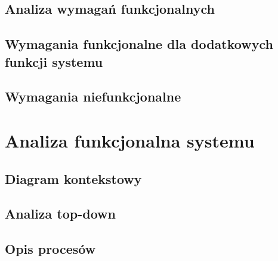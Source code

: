 \documentclass[paper=a4, fontsize=12pt]{scrartcl}
\numberwithin{equation}{section}		%
\numberwithin{figure}{section}			%
\numberwithin{table}{section}				%
\begin{document}
	\subsection{Analiza wymagań funkcjonalnych}
		

	\subsection{Wymagania funkcjonalne dla dodatkowych funkcji systemu}
		

	\subsection{Wymagania niefunkcjonalne}
		

\section{Analiza funkcjonalna systemu}

	\subsection{Diagram kontekstowy}
		

	\subsection{Analiza top-down}
		

	\subsection{Opis procesów}
		



\end{document}
